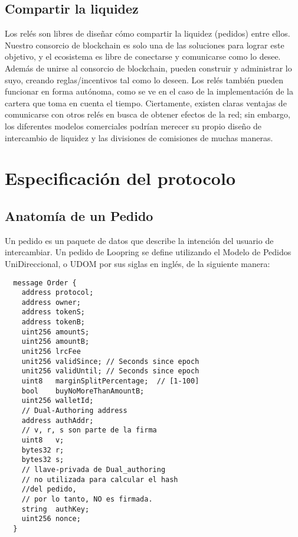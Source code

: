 \documentclass[UTF8,nofonts]{article}
\begin{document}
\begin{multicols}{2}
\subsection{Compartir la liquidez\label{sec:liquidity_sharing}}
Los rel\'es son libres de dise\~nar c\'omo compartir la liquidez (pedidos) entre ellos. Nuestro consorcio de blockchain es solo una de las soluciones para lograr este objetivo, y el ecosistema es libre de conectarse y comunicarse como lo desee. Adem\'as de unirse al consorcio de blockchain, pueden construir y administrar lo suyo, creando reglas/incentivos tal como lo deseen. Los rel\'es tambi\'en pueden funcionar en forma aut\'onoma, como se ve en el caso de la implementaci\'on de la cartera que toma en cuenta el tiempo. Ciertamente, existen claras ventajas de comunicarse con otros rel\'es en busca de obtener efectos de la red; sin embargo, los diferentes modelos comerciales podr\'ian merecer su propio dise\~no de intercambio de liquidez y las divisiones de comisiones de muchas maneras.

\section{Especificaci\'on del protocolo\label{sec:protocol}}

\subsection{Anatom\'ia de un Pedido\label{anatomy}}
Un pedido es un paquete de datos que describe la intenci\'on del usuario de intercambiar. Un pedido de Loopring se define utilizando el Modelo de Pedidos UniDireccional, o UDOM por sus siglas en ingl\'es, de la siguiente manera:
\begin{verbatim}
  message Order {
    address protocol;
    address owner;
    address tokenS;
    address tokenB;
    uint256 amountS;
    uint256 amountB;
    unit256 lrcFee
    unit256 validSince; // Seconds since epoch
    unit256 validUntil; // Seconds since epoch
    uint8   marginSplitPercentage;  // [1-100]
    bool    buyNoMoreThanAmountB;
    uint256 walletId;
    // Dual-Authoring address
    address authAddr;
   	// v, r, s son parte de la firma
    uint8   v;       
    bytes32 r;
    bytes32 s;
    // llave-privada de Dual_authoring
    // no utilizada para calcular el hash 
    //del pedido,
    // por lo tanto, NO es firmada.
    string  authKey;          
    uint256 nonce;
  }
\end{verbatim}


\end{multicols}
\end{document}
